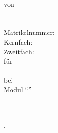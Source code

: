 

\ifx\event\undefined
\else
	\date[\mydate]{\today}
\fi

\expandafter\def\expandafter\quote\expandafter{\quote\onehalfspacing}

\doublespacing
\parindent 0pt
\parskip 12pt




\thispagestyle{empty}
\begin{titlepage}
\singlespacing
\begin{center}


\quad\\[5cm]



{%
    \normalfont\bfseries\Large\onehalfspacing
    \titel \par}
    \vskip 3.5cm

von \\[0.3cm]

\autor \\
\email \\
Matrikelnummer: \matrikelnummer \\
Kernfach:  \\
Zweitfach: \zweitfach \\[2cm]

für \\[0.3cm]

\veranstaltung \\
bei \dozentin \\
Modul "`\modul"' \\
\institut \\
\universitaet \\
\semester

\vfill

\ort, \datum


\end{center}
\end{titlepage}



\setcounter{page}{1}
